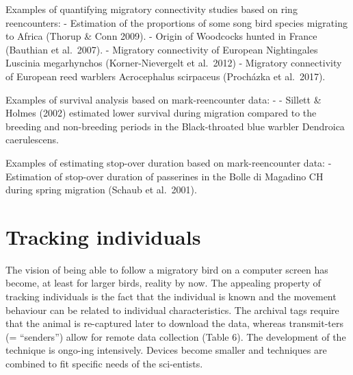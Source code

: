 \documentclass[
]{book}
\begin{document}
Examples of quantifying migratory connectivity studies based on ring reencounters:
- Estimation of the proportions of some song bird species migrating to Africa (Thorup \& Conn 2009).
- Origin of Woodcocks hunted in France (Bauthian et al.~2007).
- Migratory connectivity of European Nightingales Luscinia megarhynchos (Korner-Nievergelt et al.~2012)
- Migratory connectivity of European reed warblers Acrocephalus scirpaceus (Procházka et al.~2017).

Examples of survival analysis based on mark-reencounter data:
- - Sillett \& Holmes (2002) estimated lower survival during migration compared to the breeding and non-breeding periods in the Black-throated blue warbler Dendroica caerulescens.

Examples of estimating stop-over duration based on mark-reencounter data:
- Estimation of stop-over duration of passerines in the Bolle di Magadino CH during spring migration (Schaub et al.~2001).

\hypertarget{tracking-individuals}{%
\section{Tracking individuals}\label{tracking-individuals}}

The vision of being able to follow a migratory bird on a computer screen has become, at least for larger birds, reality by now. The appealing property of tracking individuals is the fact that the individual is known and the movement behaviour can be related to individual characteristics.
The archival tags require that the animal is re-captured later to download the data, whereas transmit-ters (= ``senders'') allow for remote data collection (Table 6). The development of the technique is ongo-ing intensively. Devices become smaller and techniques are combined to fit specific needs of the sci-entists.
\end{document}
